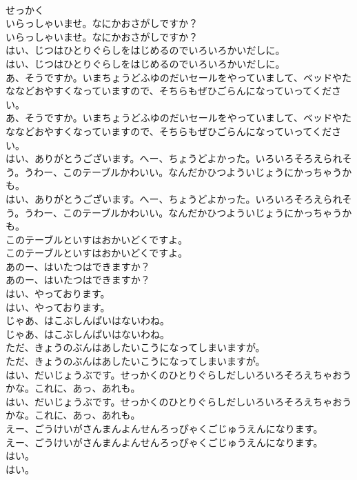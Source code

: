 \documentclass[8pt]{extreport}
\begin{document}
\begin{CJK}{UTF8}{min}
\\	せっかく
\\	いらっしゃいませ。なにかおさがしですか？	
\\	いらっしゃいませ。なにかおさがしですか？ 
\\	はい、じつはひとりぐらしをはじめるのでいろいろかいだしに。	
\\	はい、じつはひとりぐらしをはじめるのでいろいろかいだしに。 
\\	あ、そうですか。いまちょうどふゆのだいセールをやっていまして、ベッドやたななどおやすくなっていますので、そちらもぜひごらんになっていってください。	
\\	あ、そうですか。いまちょうどふゆのだいセールをやっていまして、ベッドやたななどおやすくなっていますので、そちらもぜひごらんになっていってください。 
\\	はい、ありがとうございます。へー、ちょうどよかった。いろいろそろえられそう。うわー、このテーブルかわいい。なんだかひつよういじょうにかっちゃうかも。	
\\	はい、ありがとうございます。へー、ちょうどよかった。いろいろそろえられそう。うわー、このテーブルかわいい。なんだかひつよういじょうにかっちゃうかも。　　 
\\	このテーブルといすはおかいどくですよ。	
\\	このテーブルといすはおかいどくですよ。 
\\	あのー、はいたつはできますか？	
\\	あのー、はいたつはできますか？ 
\\	はい、やっております。	
\\	はい、やっております。 
\\	じゃあ、はこぶしんぱいはないわね。	
\\	じゃあ、はこぶしんぱいはないわね。 
\\	ただ、きょうのぶんはあしたいこうになってしまいますが。	
\\	ただ、きょうのぶんはあしたいこうになってしまいますが。 
\\	はい、だいじょうぶです。せっかくのひとりぐらしだしいろいろそろえちゃおうかな。これに、あっ、あれも。	
\\	はい、だいじょうぶです。せっかくのひとりぐらしだしいろいろそろえちゃおうかな。これに、あっ、あれも。 
\\	えー、ごうけいがさんまんよんせんろっぴゃくごじゅうえんになります。	
\\	えー、ごうけいがさんまんよんせんろっぴゃくごじゅうえんになります。 
\\	はい。	
\\	はい。 

\end{CJK}
\end{document}
